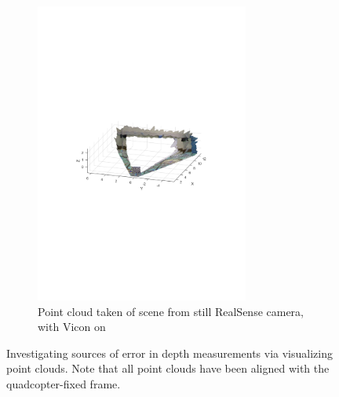 \documentclass[12pt,a4paper]{article}
\begin{document}
\begin{figure}[b!]
      ~
      \begin{subfigure}[t]{0.5\textwidth}
      \centering
        \includegraphics[width=70mm, trim = 100 300 100 290, clip]{vicon_test/with.pdf}
        \caption{Point cloud taken of scene from still RealSense camera, with Vicon on}
      \end{subfigure} 
      \caption{Investigating sources of error in depth measurements via visualizing point clouds. Note that all point clouds have been aligned with the quadcopter-fixed frame.}
      \label{f: pcs}
    \end{figure}
\end{document}
